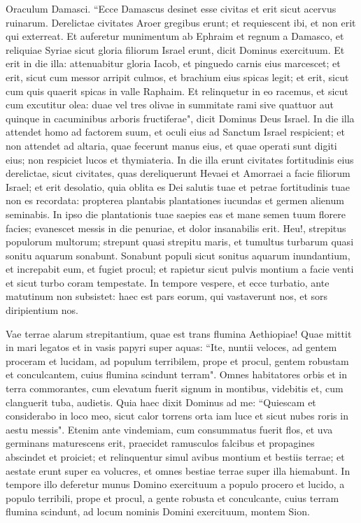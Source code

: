 \begin{biblechapter}  
\verse Oraculum Damasci. “Ecce Damascus desinet esse civitas et erit sicut acervus ruinarum. 
\verse Derelictae civitates Aroer gregibus erunt; et requiescent ibi, et non erit qui exterreat. 
\verse Et auferetur munimentum ab Ephraim et regnum a Damasco, et reliquiae Syriae sicut gloria filiorum Israel erunt, dicit Dominus exercituum. 
\verse Et erit in die illa: attenuabitur gloria Iacob, et pinguedo carnis eius marcescet; 
\verse et erit, sicut cum messor arripit culmos, et brachium eius spicas legit; et erit, sicut cum quis quaerit spicas in valle Raphaim. 
\verse Et relinquetur in eo racemus, et sicut cum excutitur olea: duae vel tres olivae in summitate rami sive quattuor aut quinque in cacuminibus arboris fructiferae", dicit Dominus Deus Israel. 
\verse In die illa attendet homo ad factorem suum, et oculi eius ad Sanctum Israel respicient; 
\verse et non attendet ad altaria, quae fecerunt manus eius, et quae operati sunt digiti eius; non respiciet lucos et thymiateria. 
\verse In die illa erunt civitates fortitudinis eius derelictae, sicut civitates, quas dereliquerunt Hevaei et Amorraei a facie filiorum Israel; et erit desolatio, 
\verse quia oblita es Dei salutis tuae et petrae fortitudinis tuae non es recordata: propterea plantabis plantationes iucundas et germen alienum seminabis. 
\verse In ipso die plantationis tuae saepies eas et mane semen tuum florere facies; evanescet messis in die penuriae, et dolor insanabilis erit. 
\verse Heu!, strepitus populorum multorum; strepunt quasi strepitu maris, et tumultus turbarum quasi sonitu aquarum sonabunt. 
\verse Sonabunt populi sicut sonitus aquarum inundantium, et increpabit eum, et fugiet procul; et rapietur sicut pulvis montium a facie venti et sicut turbo coram tempestate. 
\verse In tempore vespere, et ecce turbatio, ante matutinum non subsistet: haec est pars eorum, qui vastaverunt nos, et sors diripientium nos. 
\end{biblechapter}

\begin{biblechapter}  
\verse Vae terrae alarum strepitantium, quae est trans flumina Aethiopiae! 
\verse Quae mittit in mari legatos et in vasis papyri super aquas: “Ite, nuntii veloces, ad gentem proceram et lucidam, ad populum terribilem, prope et procul, gentem robustam et conculcantem, cuius flumina scindunt terram". 
\verse Omnes habitatores orbis et in terra commorantes, cum elevatum fuerit signum in montibus, videbitis et, cum clanguerit tuba, audietis. 
\verse Quia haec dixit Dominus ad me: “Quiescam et considerabo in loco meo, sicut calor torrens orta iam luce et sicut nubes roris in aestu messis". 
\verse Etenim ante vindemiam, cum consummatus fuerit flos, et uva germinans maturescens erit, praecidet ramusculos falcibus et propagines abscindet et proiciet; 
\verse et relinquentur simul avibus montium et bestiis terrae; et aestate erunt super ea volucres, et omnes bestiae terrae super illa hiemabunt. 
\verse In tempore illo deferetur munus Domino exercituum a populo procero et lucido, a populo terribili, prope et procul, a gente robusta et conculcante, cuius terram flumina scindunt, ad locum nominis Domini exercituum, montem Sion. 
\end{biblechapter}

